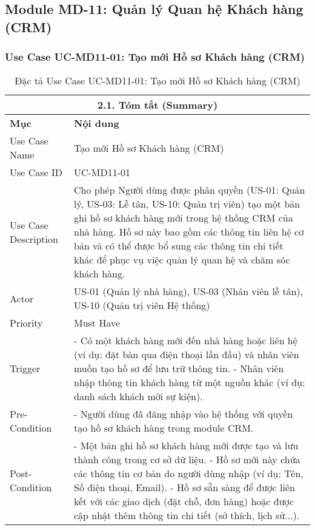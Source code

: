 \subsection{Module MD-11: Quản lý Quan hệ Khách hàng (CRM)}

\subsubsection{Use Case UC-MD11-01: Tạo mới Hồ sơ Khách hàng (CRM)}
\begin{longtable}{|m{4cm}|p{11cm}|}
\caption{Đặc tả Use Case UC-MD11-01: Tạo mới Hồ sơ Khách hàng (CRM)} \label{tab:uc_md11_01_create_customer_crm} \\
\hline
\multicolumn{2}{|c|}{\textbf{2.1. Tóm tắt (Summary)}} \\
\hline
\textbf{Mục} & \textbf{Nội dung} \\
\hline
\endhead
\midrule
\endfoot
\bottomrule
\endlastfoot
Use Case Name & Tạo mới Hồ sơ Khách hàng (CRM) \\
\hline
Use Case ID & UC-MD11-01 \\
\hline
Use Case Description & Cho phép Người dùng được phân quyền (US-01: Quản lý, US-03: Lễ tân, US-10: Quản trị viên) tạo một bản ghi hồ sơ khách hàng mới trong hệ thống CRM của nhà hàng. Hồ sơ này bao gồm các thông tin liên hệ cơ bản và có thể được bổ sung các thông tin chi tiết khác để phục vụ việc quản lý quan hệ và chăm sóc khách hàng. \\
\hline
Actor & US-01 (Quản lý nhà hàng), US-03 (Nhân viên lễ tân), US-10 (Quản trị viên Hệ thống) \\
\hline
Priority & Must Have \\
\hline
Trigger & - Có một khách hàng mới đến nhà hàng hoặc liên hệ (ví dụ: đặt bàn qua điện thoại lần đầu) và nhân viên muốn tạo hồ sơ để lưu trữ thông tin. \newline - Nhân viên nhập thông tin khách hàng từ một nguồn khác (ví dụ: danh sách khách mời sự kiện). \\
\hline
Pre-Condition & - Người dùng đã đăng nhập vào hệ thống với quyền tạo hồ sơ khách hàng trong module CRM. \\
\hline
Post-Condition & - Một bản ghi hồ sơ khách hàng mới được tạo và lưu thành công trong cơ sở dữ liệu. \newline - Hồ sơ mới này chứa các thông tin cơ bản do người dùng nhập (ví dụ: Tên, Số điện thoại, Email). \newline - Hồ sơ sẵn sàng để được liên kết với các giao dịch (đặt chỗ, đơn hàng) hoặc được cập nhật thêm thông tin chi tiết (sở thích, lịch sử...). \\

\end{longtable}

